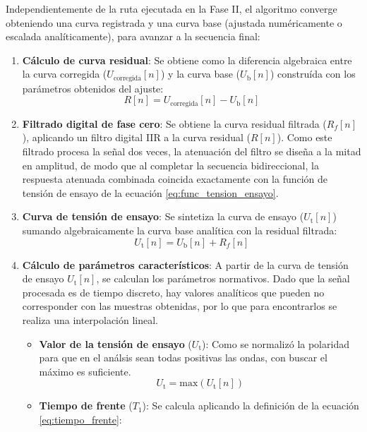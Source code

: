 Independientemente de la ruta ejecutada en la Fase II, el algoritmo converge obteniendo una curva registrada y una curva base (ajustada numéricamente o escalada analíticamente), para avanzar a la secuencia final:
\begin{enumerate}[resume]
    \item \textbf{Cálculo de curva residual}: Se obtiene como la diferencia algebraica entre la curva corregida ($U_{\text{corregida}}[n]$) y la curva base ($U_\text{b}[n]$) construída con los parámetros obtenidos del ajuste:
    \begin{equation}
        R[n] = U_{\text{corregida}}[n] - U_\text{b}[n]
        \label{eq:curva_residual}
    \end{equation}
    \item \textbf{Filtrado digital de fase cero}: 
    Se obtiene la curva residual filtrada ($R_f[n]$), aplicando un filtro digital IIR a la curva residual ($R[n]$). Como este filtrado procesa la señal dos veces, la atenuación del filtro se diseña a la mitad en amplitud, de modo que al completar la secuencia bidireccional, la respuesta atenuada combinada coincida exactamente con la función de tensión de ensayo de la ecuación \ref{eq:func_tension_ensayo}.
    \item \textbf{Curva de tensión de ensayo}: Se sintetiza la curva de ensayo ($U_\text{t}[n]$) sumando algebraicamente la curva base analítica con la residual filtrada:
    \begin{equation}
        U_\text{t}[n] = U_\text{b}[n] + R_f[n]
        \label{eq:curva_ensayo}
    \end{equation}
    \item \textbf{Cálculo de parámetros característicos}: A partir de la curva de tensión de ensayo $U_\text{t}[n]$, se calculan los parámetros normativos. Dado que la señal procesada es de tiempo discreto, hay valores analíticos que pueden no corresponder con las muestras obtenidas, por lo que para encontrarlos se realiza una interpolación lineal.
    \begin{itemize}
        \item \textbf{Valor de la tensión de ensayo} ($U_\text{t}$): Como se normalizó la polaridad para que en el análsis sean todas positivas las ondas, con buscar el máximo es suficiente.
        \begin{equation}
            U_\text{t} = \text{max}(U_\text{t}[n])
            \label{eq:valor_cresta}
        \end{equation}
        \item \textbf{Tiempo de frente} ($T_1$): Se calcula aplicando la definición de la ecuación \ref{eq:tiempo_frente}:

\end{itemize}
\end{enumerate}
